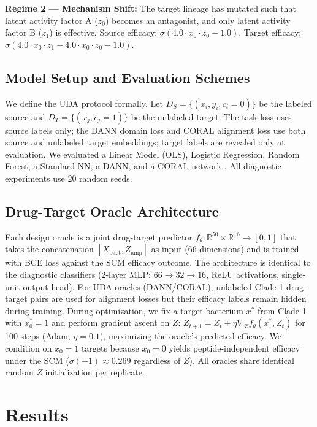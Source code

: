 \documentclass{article}
\begin{document}
\textbf{Regime 2 --- Mechanism Shift:} The target lineage has mutated such that latent activity factor A ($z_0$) becomes an antagonist, and only latent activity factor B ($z_1$) is effective. Source efficacy: $\sigma(4.0 \cdot x_0 \cdot z_0 - 1.0)$. Target efficacy: $\sigma(4.0 \cdot x_0 \cdot z_1 - 4.0 \cdot x_0 \cdot z_0 - 1.0)$.

\subsection{Model Setup and Evaluation Schemes}
We define the UDA protocol formally. Let $D_S = \{(x_i, y_i, c_i{=}0)\}$ be the labeled source and $D_T = \{(x_j, c_j{=}1)\}$ be the unlabeled target. The task loss uses source labels only; the DANN domain loss and CORAL alignment loss use both source and unlabeled target embeddings; target labels are revealed only at evaluation. We evaluated a Linear Model (OLS), Logistic Regression, Random Forest, a Standard NN, a DANN, and a CORAL network \cite{sun2016deep}. All diagnostic experiments use 20 random seeds.

\subsection{Drug-Target Oracle Architecture}
Each design oracle is a joint drug-target predictor $f_\theta: \mathbb{R}^{50} \times \mathbb{R}^{16} \to [0,1]$ that takes the concatenation $[X_{\text{bact}}, Z_{\text{amp}}]$ as input (66 dimensions) and is trained with BCE loss against the SCM efficacy outcome. The architecture is identical to the diagnostic classifiers (2-layer MLP: $66 \to 32 \to 16$, ReLU activations, single-unit output head). For UDA oracles (DANN/CORAL), unlabeled Clade 1 drug-target pairs are used for alignment losses but their efficacy labels remain hidden during training. During optimization, we fix a target bacterium $x^*$ from Clade 1 with $x_0^* = 1$ and perform gradient ascent on $Z$: $Z_{t+1} = Z_t + \eta \nabla_Z f_\theta(x^*, Z_t)$ for 100 steps (Adam, $\eta = 0.1$), maximizing the oracle's predicted efficacy. We condition on $x_0{=}1$ targets because $x_0{=}0$ yields peptide-independent efficacy under the SCM ($\sigma(-1) \approx 0.269$ regardless of $Z$). All oracles share identical random $Z$ initialization per replicate.

\section{Results}
\end{document}

